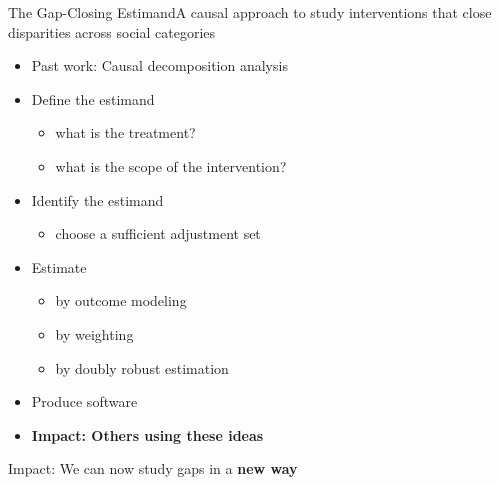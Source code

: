 \documentclass{beamer}
\newcommand\bblue[1]{{\color{blue}\textbf{#1}}}
\begin{document}
{\begin{frame}{The Gap-Closing Estimand}{A causal approach to study interventions that close disparities across social categories}
	\begin{itemize}
		\item Past work: Causal decomposition analysis
		\item Define the estimand
		\begin{itemize}
			\item what is the treatment?
			\item what is the scope of the intervention?
		\end{itemize}
		\item Identify the estimand
		\begin{itemize}
			\item choose a sufficient adjustment set
		\end{itemize}
		\item Estimate
		\begin{itemize}
			\item by outcome modeling
			\item by weighting
			\item by doubly robust estimation
		\end{itemize}
		\item Produce software
		\item \bblue{Impact: Others using these ideas}
	\end{itemize}
\end{frame}



\begin{frame}{Impact: We can now study gaps in a \bblue{new way}}


\end{frame}}
\end{document}
